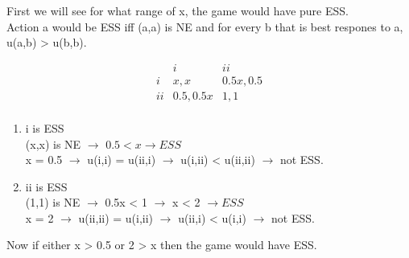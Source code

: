 \begin{latin}
    
\noindent
First we will see for what range of x, the game would have pure ESS.\\
Action a would be ESS iff (a,a) is NE and for every b that is best respones to a, u(a,b) > u(b,b).

\begin{center}

    \begin{equation*}
        \begin{matrix}
               & i        & ii       \\
            i  & x,x      & 0.5x,0.5 \\
            ii & 0.5,0.5x & 1,1      \\
        \end{matrix}
    \end{equation*}
\end{center}
\begin{enumerate}
    \item i is ESS 
    \\
    (x,x) is NE $\rightarrow$ $0.5 < x \rightarrow ESS $ \\
    x = 0.5 $\rightarrow$ u(i,i) = u(ii,i) $\rightarrow$ u(i,ii) < u(ii,ii) $\rightarrow$ not ESS.
    \item ii is ESS
    \\
    (1,1) is NE $\rightarrow$ 0.5x < 1 $\rightarrow$ x < 2 $\rightarrow ESS$\\
    x = 2 $\rightarrow$ u(ii,ii) = u(i,ii) $\rightarrow$ u(ii,i) < u(i,i) $\rightarrow$ not ESS.
\end{enumerate}
Now if either x > 0.5 or 2 > x then the game would have ESS.
\end{latin}